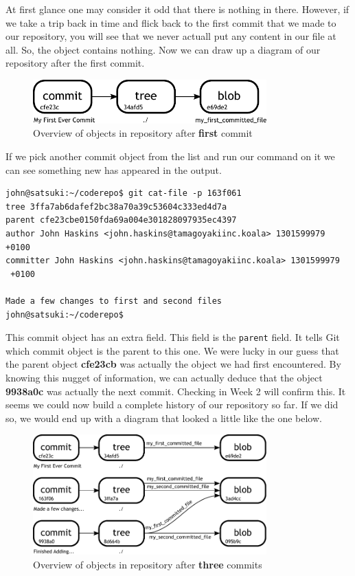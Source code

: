 At first glance one may consider it odd that there is nothing in there.  However, if we take a trip back in time and flick back to the first commit that we made to our repository, you will see that we never actuall put any content in our file at all.  So, the object contains nothing.  Now we can draw up a diagram of our repository after the first commit.

\begin{figure}[hbt]
\centering
\includegraphics[width=9cm]{images/f-af2-d2.pdf}
\caption{Overview of objects in repository after \textbf{first} commit}
\end{figure}

If we pick another commit object from the list and run our command on it we can see something new has appeared in the output.

\begin{Verbatim}
john@satsuki:~/coderepo$ git cat-file -p 163f061
tree 3ffa7ab6dafef2bc38a70a39c53604c333ed4d7a
parent cfe23cbe0150fda69a004e301828097935ec4397
author John Haskins <john.haskins@tamagoyakiinc.koala> 1301599979 +0100
committer John Haskins <john.haskins@tamagoyakiinc.koala> 1301599979 
 +0100

Made a few changes to first and second files
john@satsuki:~/coderepo$ 
\end{Verbatim}

This commit object has an extra field.  This field is the \texttt{parent} field.  It tells Git which commit object is the parent to this one.  We were lucky in our guess that the parent object \textbf{cfe23cb} was actually the object we had first encountered.  By knowing this nugget of information, we can actually deduce that the object \textbf{9938a0c} was actually the next commit.  Checking in Week 2 will confirm this.  It seems we could now build a complete history of our repository so far.  If we did so, we would end up with a diagram that looked a little like the one below.

\begin{figure}[hbt]
\centering
\includegraphics[width=9cm]{images/f-af2-d3.pdf}
\caption{Overview of objects in repository after \textbf{three} commits}
\end{figure}

